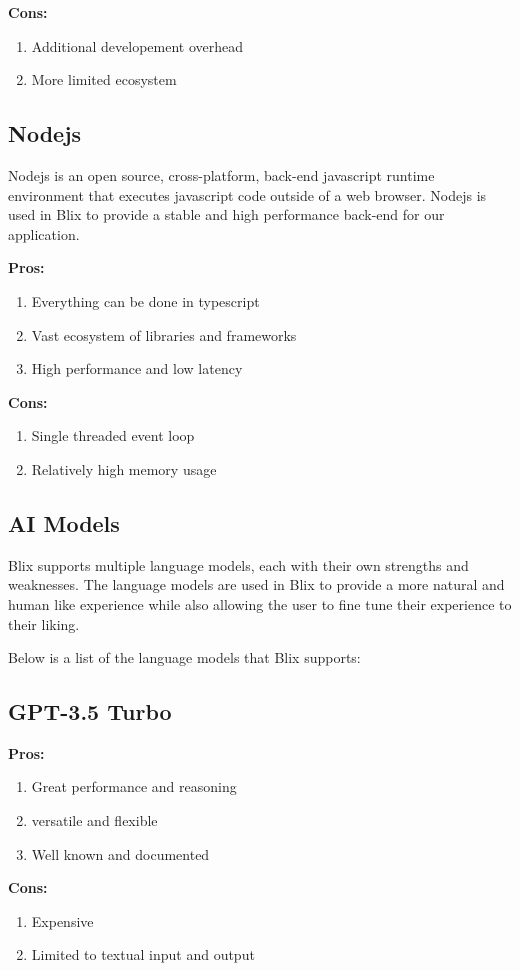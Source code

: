 \documentclass[11pt,a4paper]{article}
\begin{document}
\textbf{Cons:}
\begin{enumerate}[label*=\arabic*.]
	\item[\textbullet] Additional developement overhead
	\item[\textbullet] More limited ecosystem
\end{enumerate}

\subsection{Nodejs}

Nodejs is an open source, cross-platform, back-end javascript runtime environment that
executes javascript code outside of a web browser. Nodejs is used in Blix to provide a
stable and high performance back-end for our application.

\textbf{Pros:}
\begin{enumerate}[label*=\arabic*.]
	\item[\textbullet] Everything can be done in typescript
	\item[\textbullet] Vast ecosystem of libraries and frameworks
	\item[\textbullet] High performance and low latency
\end{enumerate}

\textbf{Cons:}
\begin{enumerate}[label*=\arabic*.]
	\item[\textbullet] Single threaded event loop
	\item[\textbullet] Relatively high memory usage
\end{enumerate}

\subsection{AI Models}

Blix supports multiple language models, each with their own strengths and weaknesses.
The language models are used in Blix to provide a more natural and human like experience
while also allowing the user to fine tune their experience to their liking.

Below is a list of the language models that Blix supports:

\subsection{GPT-3.5 Turbo}

\textbf{Pros:}
\begin{enumerate}[label*=\arabic*.]
    \item [\textbullet] Great performance and reasoning
	\item [\textbullet] versatile and flexible
	\item[\textbullet] Well known and documented
\end{enumerate}

\textbf{Cons:}
\begin{enumerate}[label*=\arabic*.]
	\item[\textbullet] Expensive	
	\item[\textbullet] Limited to textual input and output
\end{enumerate}
\end{document}
